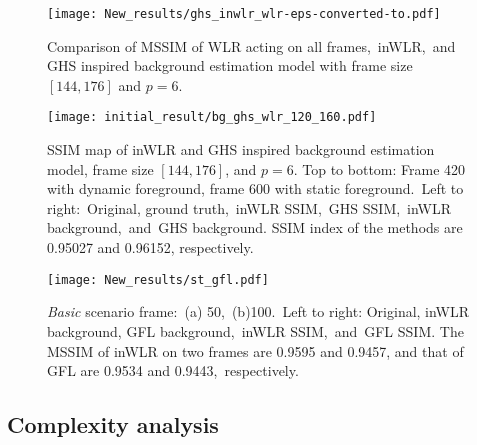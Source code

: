 \documentclass[10pt,twocolumn,letterpaper]{article}
\begin{document}
\begin{figure}
    \centering
    \texttt{[image: New\_results/ghs\_inwlr\_wlr-eps-converted-to.pdf]}
    \caption{Comparison of MSSIM of WLR acting on all frames,~inWLR,~and GHS inspired background estimation model with frame size $[144,176]$ and $p=6$.}
    \label{ssim}
\end{figure}



\begin{figure*}
    \centering
    \texttt{[image: initial\_result/bg\_ghs\_wlr\_120\_160.pdf]}
    \caption{SSIM map of inWLR and GHS inspired background estimation model, frame size $[144,176]$, and $p=6$. Top to bottom: Frame 420 with dynamic foreground, frame 600 with static foreground.~Left to right:~Original, ground truth,~inWLR SSIM,~GHS SSIM,~inWLR background,~and~GHS background. SSIM index of the methods are 0.95027 and 0.96152, respectively.}
    \label{ssim_map}
\end{figure*}
\begin{figure*}
    \centering
    \texttt{[image: New\_results/st\_gfl.pdf]}
    \caption{{\it Basic} scenario frame:~(a) 50,~(b)100.~Left to right: Original, inWLR background, GFL background,~inWLR SSIM,~and~GFL SSIM. The MSSIM of inWLR on two frames are 0.9595 and 0.9457, and that of GFL are 0.9534 and 0.9443,~respectively.}
    \label{gfl_inwlr}
\end{figure*}


\vspace{-0.0in}
\subsection{Complexity analysis}
\vspace{-0.0in}
\end{document}
